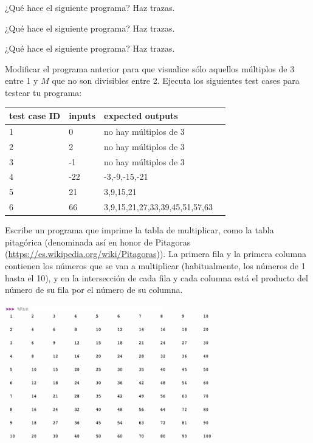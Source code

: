 \begin{ejercicio}
¿Qué hace el siguiente programa? Haz trazas.

\end{ejercicio}

\begin{ejercicio}
¿Qué hace el siguiente programa? Haz trazas.

\end{ejercicio}

\begin{ejercicio}
¿Qué hace el siguiente programa? Haz trazas.

\end{ejercicio}



\begin{ejercicio} 
Modificar el programa anterior para que visualice sólo aquellos múltiplos de 3 entre 1 y $M$ que no son divisibles entre 2. Ejecuta los siguientes test cases para testear tu programa:

\begin{tabular}{|l|l|l|l|}
\hline
test case ID  & inputs & expected outputs  \\ 
\hline\hline
1 & 0 & no hay múltiplos de 3\\
2 & 2 & no hay múltiplos de 3\\
3 & -1 & no hay múltiplos de 3\\
4 & -22 & -3,-9,-15,-21\\
5 & 21 & 3,9,15,21\\
6 & 66 & 3,9,15,21,27,33,39,45,51,57,63\\
\hline
\end{tabular}
\end{ejercicio}


\begin{ejercicio}
Escribe un programa que imprime la tabla de multiplicar, como la tabla pitagórica (denominada así en honor de Pitagoras (\url{https://es.wikipedia.org/wiki/Pitagoras})). La primera fila y la primera columna contienen los números que se van a multiplicar (habitualmente, los números de 1 hasta el 10), y en la intersección de cada fila y cada columna está el producto del número de su fila por el número de su columna.


\includegraphics[width=0.75\textwidth]{images/pitagoras.png}
  

\end{ejercicio}

